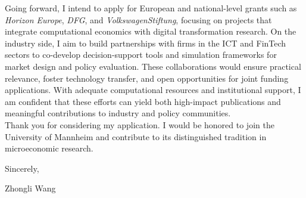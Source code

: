 \documentclass{nfr}
\begin{document}
Going forward, I intend to apply for European and national-level grants such as \textit{Horizon Europe}, \textit{DFG}, and \textit{VolkswagenStiftung}, focusing on projects that integrate computational economics with digital transformation research. On the industry side, I aim to build partnerships with firms in the ICT and FinTech sectors to co-develop decision-support tools and simulation frameworks for market design and policy evaluation. These collaborations would ensure practical relevance, foster technology transfer, and open opportunities for joint funding applications. With adequate computational resources and institutional support, I am confident that these efforts can yield both high-impact publications and meaningful contributions to industry and policy communities.\\

Thank you for considering my application. 
I would be honored to join the University of Mannheim and contribute to its distinguished tradition in microeconomic research.\\
\vspace{10mm}

\noindent Sincerely,\\
\vspace{19mm}

\noindent Zhongli Wang

\vspace{10mm}


\end{document}
